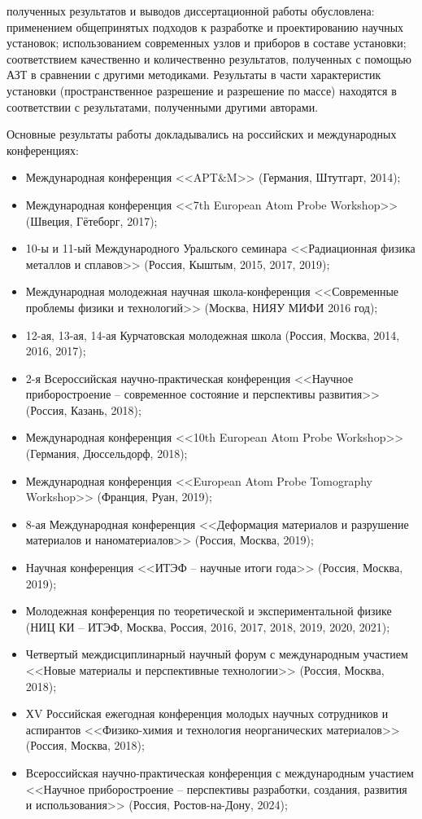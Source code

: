 {\reliability} полученных результатов и выводов диссертационной работы обусловлена: применением общепринятых подходов к разработке и проектированию научных установок; использованием современных узлов и приборов в составе установки; соответствием качественно и количественно результатов, полученных с помощью АЗТ в сравнении с другими методиками. Результаты в части характеристик установки (пространственное разрешение и разрешение по массе) находятся в соответствии с результатами, полученными другими авторами.


{\probation}
Основные результаты работы докладывались на российских и международных конференциях:
\begin{itemize}
	\item Международная конференция <<APT$\&$M>> (Германия, Штутгарт, 2014);
	\item Международная конференция <<7th European Atom Probe Workshop>> (Швеция, Гётеборг, 2017);
	\item 10-ы и 11-ый Международного Уральского семинара <<Радиационная физика металлов и сплавов>> (Россия, Кыштым, 2015, 2017, 2019);
	\item Международная молодежная научная школа-конференция <<Современные проблемы физики и технологий>> (Москва, НИЯУ МИФИ 2016 год);
	\item 12-ая, 13-ая, 14-ая Курчатовская молодежная школа (Россия, Москва, 2014, 2016, 2017);
	\item 2-я Всероссийская научно-практическая конференция <<Научное приборостроение – современное состояние и перспективы развития>> (Россия, Казань, 2018);
	\item Международная конференция <<10th European Atom Probe Workshop>> (Германия, Дюссельдорф, 2018);
	\item Международная конференция <<European Atom Probe Tomography Workshop>> (Франция, Руан, 2019);
	\item 8-ая Международная конференция <<Деформация материалов и разрушение материалов и наноматериалов>> (Россия, Москва, 2019); 
	\item Научная конференция <<ИТЭФ – научные итоги года>> (Россия, Москва, 2019);
	\item Молодежная конференция по теоретической и экспериментальной физике (НИЦ КИ – ИТЭФ, Москва, Россия, 2016, 2017, 2018, 2019, 2020, 2021);
	\item Четвертый междисциплинарный научный форум с международным участием <<Новые материалы и перспективные технологии>> (Россия, Москва, 2018);
	\item ХV Российская ежегодная конференция молодых научных сотрудников и аспирантов <<Физико-химия и технология неорганических материалов>> (Россия, Москва, 2018);
	\item Всероссийская научно-практическая конференция с международным участием <<Научное приборостроение – перспективы разработки, создания, развития и использования>> (Россия, Ростов-на-Дону, 2024);
	
\end{itemize}
